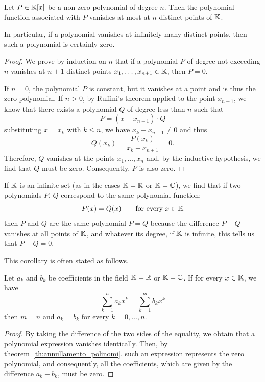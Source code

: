   \begin{theorem}
  \label{th:annullamento_polinomi}%
  Let $P\in {\mathbb K}[x]$ be a non-zero polynomial of degree $n$.
  Then the polynomial function associated with $P$
  vanishes at most at $n$ distinct points of ${\mathbb K}$.
  
  In particular, if a polynomial vanishes at infinitely
  many distinct points, then such a polynomial is certainly zero.
  \end{theorem}
  \begin{proof}
  We prove by induction on $n$ that if a polynomial
  $P$ of degree not exceeding $n$ vanishes at $n+1$
  distinct points $x_1, \dots, x_{n+1}\in {\mathbb K}$, then
  $P=0$.
  
  If $n=0$, the polynomial $P$ is constant, but it vanishes
  at a point and is thus the zero polynomial.
  If $n>0$, by Ruffini's theorem applied to
  the point $x_{n+1}$, we know that there exists a polynomial $Q$
  of degree less than $n$ such that
  \[
    P = (x-x_{n+1}) \cdot Q
  \]
  substituting $x=x_k$ with $k\le n$, we have $x_k-x_{n+1}\neq 0$
  and thus
  \[
    Q(x_k) = \frac{P(x_k)}{x_k-x_{n+1}} = 0.
  \]
  Therefore, $Q$ vanishes at the points $x_1, \dots, x_n$
  and, by the inductive hypothesis, we find that $Q$ must
  be zero. Consequently, $P$ is also zero.
  \end{proof}
  
  If ${\mathbb K}$ is an infinite set (as in the cases ${\mathbb K}={\mathbb R}$ or ${\mathbb K}={\mathbb C}$),
  we find that
  if two polynomials $P$, $Q$ correspond
  to the same polynomial function:
  \[
    P(x) = Q(x) \qquad \text{for every $x\in {\mathbb K}$}
  \]
  then $P$ and $Q$ are the same polynomial $P=Q$
  because the difference $P-Q$ vanishes at all points
  of ${\mathbb K}$, and whatever its degree, if ${\mathbb K}$ is infinite,
  this tells us that $P-Q=0$. 
  
  This corollary is often stated as follows.
  \begin{theorem}
    Let $a_k$ and $b_k$ be coefficients in the field ${\mathbb K}={\mathbb R}$ or ${\mathbb K}={\mathbb C}$.
    If for every $x\in {\mathbb K}$, we have 
    \[
       \sum_{k=1}^n a_k x^k = \sum_{k=1}^m b_k x^k
    \]
    then $m=n$ and $a_k=b_k$ for every $k=0, \dots, n$.
  \end{theorem}
  \begin{proof}
  By taking the difference of the two sides of the equality, we obtain 
  that a polynomial expression vanishes identically. 
  Then, by theorem~\ref{th:annullamento_polinomi}, such an expression 
  represents the zero polynomial, and consequently, all the coefficients, 
  which are given by the difference $a_k-b_k$, must be zero.
  \end{proof}
  
